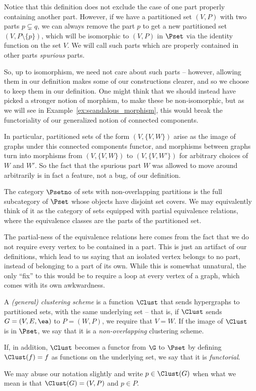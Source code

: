 \documentclass[a4paper,reqno,oneside]{article} %
\begin{document}
\begin{remark}
    Notice that this definition does not exclude the case of one part properly containing another part. However, if we have a partitioned set $(V,P)$ with two parts $p \subsetneq q$, we can always remove the part $p$ to get a new partitioned set $(V, P \setminus \{p\})$, which will be isomorphic to $(V, P)$ in $\Pset$ via the identity function on the set $V$. We will call such parts which are properly contained in other parts \emph{spurious} parts.

    So, up to isomorphism, we need not care about such parts -- however, allowing them in our definition makes some of our constructions clearer, and so we choose to keep them in our definition. One might think that we should instead have picked a stronger notion of morphism, to make these be non-isomorphic, but as we will see in Example~\ref{ex:scandalous_morphism}, this would break the functoriality of our generalized notion of connected components.
    
    In particular, partitioned sets of the form $(V, \{V,W\})$ arise as the image of graphs under this connected components functor, and morphisms between graphs turn into morphisms from $(V, \{V,W\})$ to $(V, \{V,W'\})$ for arbitrary choices of $W$ and $W'$. So the fact that the spurious part $W$ was allowed to move around arbitrarily is in fact a feature, not a bug, of our definition.
\end{remark}

\begin{definition}
    The category $\Psetno$ of sets with non-overlapping partitions is the full subcategory of $\Pset$ whose objects have disjoint set covers. We may equivalently think of it as the category of sets equipped with partial equivalence relations, where the equivalence classes are the parts of the partitioned set.
    
    The partial-ness of the equivalence relations here comes from the fact that we do not require every vertex to be contained in a part. This is just an artifact of our definitions, which lead to us saying that an isolated vertex belongs to no part, instead of belonging to a part of its own. While this is somewhat unnatural, the only ``fix'' to this would be to require a loop at every vertex of a graph, which comes with its own awkwardness.
\end{definition}

\begin{definition}
    A \emph{(general) clustering scheme} is a function $\Clust$ that sends hypergraphs to partitioned sets, with the same underlying set -- that is, if $\Clust$ sends $G = (V,E,\ea)$ to $P = (W, P)$, we require that $V = W$. If the image of $\Clust$ is in $\Pset$, we say that it is a \emph{non-overlapping} clustering scheme.
    
    If, in addition, $\Clust$ becomes a functor from $\G$ to $\Pset$ by defining $\Clust(f) = f$ as functions on the underlying set, we say that it is \emph{functorial}.
    
    We may abuse our notation slightly and write $p \in \Clust(G)$ when what we mean is that $\Clust(G) = (V,P)$ and $p \in P$.
\end{definition}
\end{document}
